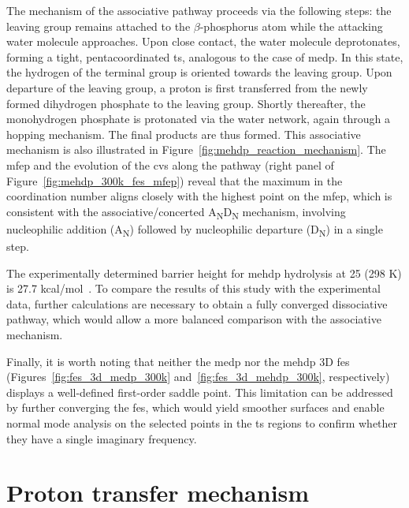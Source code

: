 The mechanism of the associative pathway proceeds via the following steps: the leaving group remains attached to the $\beta$-phosphorus atom while the attacking water molecule approaches. Upon close contact, the water molecule deprotonates, forming a tight, pentacoordinated \ac{ts}, analogous to the case of \ac{medp}. In this state, the hydrogen of the terminal group is oriented towards the leaving group. Upon departure of the leaving group, a proton is first transferred from the newly formed dihydrogen phosphate to the leaving group. Shortly thereafter, the monohydrogen phosphate is protonated via the water network, again through a hopping mechanism. The final products are thus formed. This associative mechanism is also illustrated in Figure~\ref{fig:mehdp_reaction_mechanism}. The \ac{mfep} and the evolution of the \acp{cv} along the pathway (right panel of Figure~\ref{fig:mehdp_300k_fes_mfep}) reveal that the maximum in the coordination number aligns closely with the highest point on the \ac{mfep}, which is consistent with the associative/concerted A\textsubscript{N}D\textsubscript{N} mechanism, involving nucleophilic addition (A\textsubscript{N}) followed by nucleophilic departure (D\textsubscript{N}) in a single step.

The experimentally determined barrier height for \ac{mehdp} hydrolysis at 25 (298 K) is 27.7 kcal/mol~\citep{wolfendenDegreesDifficultyWaterConsuming2006}. To compare the results of this study with the experimental data, further calculations are necessary to obtain a fully converged dissociative pathway, which would allow a more balanced comparison with the associative mechanism.

Finally, it is worth noting that neither the \ac{medp} nor the \ac{mehdp} 3D \ac{fes} (Figures~\ref{fig:fes_3d_medp_300k} and~\ref{fig:fes_3d_mehdp_300k}, respectively) displays a well-defined first-order saddle point. This limitation can be addressed by further converging the \ac{fes}, which would yield smoother surfaces and enable normal mode analysis on the selected points in the \ac{ts} regions to confirm whether they have a single imaginary frequency.




\section{Proton transfer mechanism}

